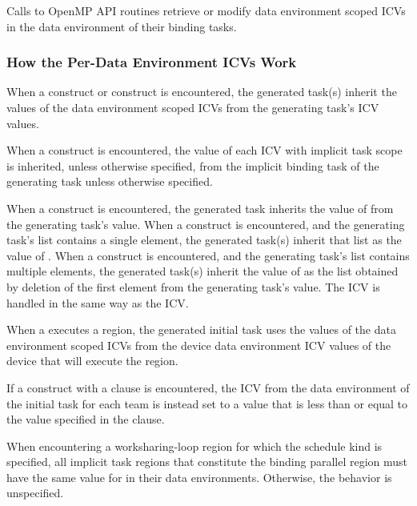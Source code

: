 Calls to OpenMP API routines retrieve or modify data environment scoped ICVs in the
data environment of their binding tasks.



\subsubsection{How the Per-Data Environment ICVs Work}
\label{subsubsec:How the Per-Data Environment ICVs Work}

When a  construct or  construct is encountered, the 
generated task(s) inherit the values of the data environment scoped ICVs from 
the generating task's ICV values.

When a  construct is encountered, the value of each ICV with
implicit task scope is inherited, unless otherwise specified, from the implicit
binding task of the generating task unless otherwise specified.

When a  construct is encountered, the generated task inherits the 
value of  from the generating task's  value. 
When a  construct is encountered, and the generating task's 
 list contains a single element, the generated task(s) inherit 
that list as the value of . When a  construct is 
encountered, and the generating task's  list contains multiple 
elements, the generated task(s) inherit the value of  as the 
list obtained by deletion of the first element from the generating task's 
 value. The  ICV is handled in the same way 
as the  ICV.

When a  executes a  region, the generated initial
task uses the values of the data environment scoped ICVs from the device data
environment ICV values of the device that will execute the region.

If a  construct with a  clause is encountered,
the  ICV from the data environment of the initial task for
each team is instead set to a value that is less than or equal to the value
specified in the clause.

When encountering a worksharing-loop region for which the 
schedule kind is specified, all implicit task regions that constitute the 
binding parallel region must have the same value for  
in their data environments. Otherwise, the behavior is unspecified.



